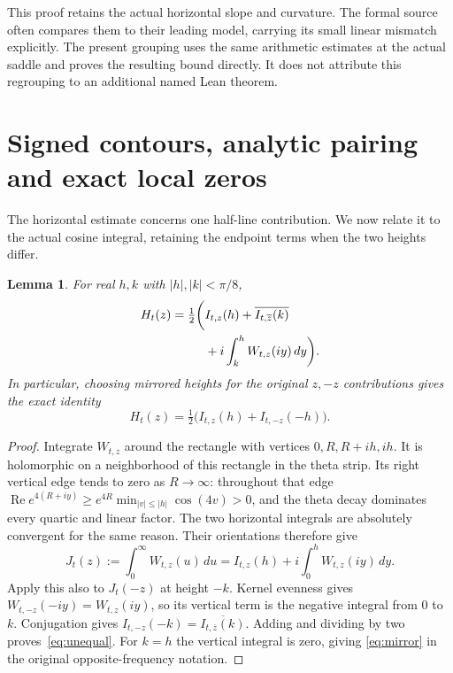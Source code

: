\documentclass[11pt]{article}
\newtheorem{lemma}[theorem]{Lemma}
\theoremstyle{remark}\newtheorem{remark}[theorem]{Remark}
\DeclareMathOperator{\Rea}{Re}\DeclareMathOperator{\Ima}{Im}
\begin{document}
This proof retains the actual horizontal slope and curvature.
The formal source often compares them to their leading model,
carrying its small linear mismatch explicitly. The present
grouping uses the same arithmetic estimates at the actual
saddle and proves the resulting bound directly. It does not
attribute this regrouping to an additional named Lean theorem.

\section{Signed contours, analytic pairing and exact local zeros}
The horizontal estimate concerns one half-line contribution.
We now relate it to the actual cosine integral, retaining
the endpoint terms when the two heights differ.

\begin{lemma}\label{lem:contour}
For real $h,k$ with $|h|,|k|<\pi/8$,
\begin{align}\label{eq:unequal}
 H_t(z)=\tfrac12\bigg(&I_{t,z}(h)
       +\overline{I_{t,\overline z}(k)}\notag\\
       &+i\int_k^hW_{t,z}(iy)\,dy\bigg).
\end{align}
In particular, choosing mirrored heights for the original
$z,-z$ contributions gives the exact identity
\begin{equation}\label{eq:mirror}
 H_t(z)=\tfrac12\bigl(I_{t,z}(h)+I_{t,-z}(-h)\bigr).
\end{equation}
\end{lemma}
\begin{proof}
Integrate $W_{t,z}$ around the rectangle with vertices
$0,R,R+ih,ih$. It is holomorphic on a neighborhood of this
rectangle in the theta strip. Its right vertical edge tends
to zero as $R\to\infty$: throughout that edge
$\Rea e^{4(R+iy)}\geq e^{4R}\min_{|v|\leq|h|}\cos(4v)>0$,
and the theta decay dominates every quartic and linear factor.
The two horizontal integrals are absolutely convergent for
the same reason. Their orientations therefore give
\[
 J_t(z):=\int_0^\infty W_{t,z}(u)\,du
       =I_{t,z}(h)+i\int_0^hW_{t,z}(iy)\,dy.
\]
Apply this also to $J_t(-z)$ at height $-k$.
Kernel evenness gives $W_{t,-z}(-iy)=W_{t,z}(iy)$, so its
vertical term is the negative integral from $0$ to $k$.
Conjugation gives
$I_{t,-z}(-k)=\overline{I_{t,\overline z}(k)}$.
Adding and dividing by two proves~\eqref{eq:unequal}.
For $k=h$ the vertical integral is zero, giving
\eqref{eq:mirror} in the original opposite-frequency notation.
\end{proof}
\end{document}
